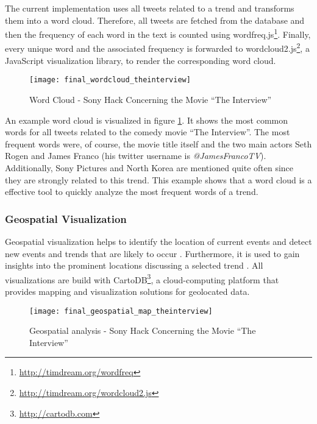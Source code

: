 The current implementation uses all tweets related to a trend and transforms them into a word cloud. Therefore, all tweets are fetched from the database and then the frequency of each word in the text is counted using wordfreq.js\footnote{\url{http://timdream.org/wordfreq} \accessednote}. Finally, every unique word and the associated frequency is forwarded to wordcloud2.js\footnote{\url{http://timdream.org/wordcloud2.js} \accessednote}, a JavaScript visualization library, to render the corresponding word cloud.

\begin{figure}[H]
  \centering
        \texttt{[image: final\_wordcloud\_theinterview]}
  \caption[Word Cloud - Sony Hack Concerning the Movie \enquote{The Interview}]{Word Cloud - Sony Hack Concerning the Movie \enquote{The Interview}}
  \label{fig:word-cloud-interview}
  \vspace{-1.3em}
\end{figure}

An example word cloud is visualized in figure \ref{fig:word-cloud-interview}. It shows the most common words for all tweets related to the comedy movie \enquote{The Interview}. The most frequent words were, of course, the movie title itself and the two main actors Seth Rogen and James Franco (his twitter username is \textit{@JamesFrancoTV}). Additionally, Sony Pictures and North Korea are mentioned quite often since they are strongly related to this trend. This example shows that a word cloud is a effective tool to quickly analyze the most frequent words of a trend.

\subsubsection{Geospatial Visualization}
\label{subsubsection:vis-geospatial}
Geospatial visualization helps to identify the location of current events and detect new events and trends that are likely to occur \cite{TwitterDataAnalytics2013}. Furthermore, it is used to gain insights into the prominent locations discussing a selected trend \cite[64-66]{TwitterDataAnalytics2013}. All visualizations are build with CartoDB\footnote{\url{http://cartodb.com} \accessednote}, a cloud-computing platform that provides mapping and visualization solutions for geolocated data.

\begin{figure}[H]
  \centering
        \texttt{[image: final\_geospatial\_map\_theinterview]}
  \caption[Geospatial analysis - Sony Hack Concerning the Movie \enquote{The Interview}]{Geospatial analysis - Sony Hack Concerning the Movie \enquote{The Interview}}
  \label{fig:map-interview}
  \vspace{-1.3em}
\end{figure}

